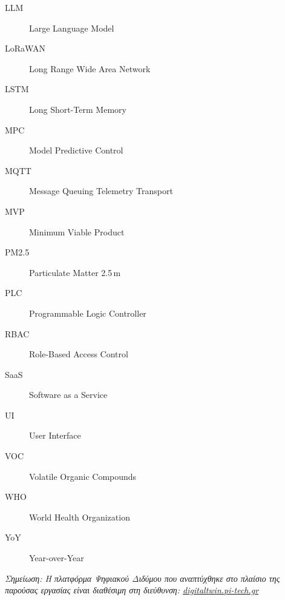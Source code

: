 \begin{description}
  \item[\textlatin{LLM}] \textlatin{Large Language Model}
  \item[\textlatin{LoRaWAN}] \textlatin{Long Range Wide Area Network}
  \item[\textlatin{LSTM}] \textlatin{Long Short-Term Memory}
  \item[\textlatin{MPC}] \textlatin{Model Predictive Control}
  \item[\textlatin{MQTT}] \textlatin{Message Queuing Telemetry Transport}
  \item[\textlatin{MVP}] \textlatin{Minimum Viable Product}
  \item[\textlatin{PM2.5}] \textlatin{Particulate Matter 2.5\,\textmu m}
  \item[\textlatin{PLC}] \textlatin{Programmable Logic Controller}
  \item[\textlatin{RBAC}] \textlatin{Role-Based Access Control}
  \item[\textlatin{SaaS}] \textlatin{Software as a Service}
  \item[\textlatin{UI}] \textlatin{User Interface}
  \item[\textlatin{VOC}] \textlatin{Volatile Organic Compounds}
  \item[\textlatin{WHO}] \textlatin{World Health Organization}
  \item[\textlatin{YoY}] \textlatin{Year-over-Year}
\end{description}

\noindent\textit{Σημείωση: Η πλατφόρμα Ψηφιακού Διδύμου που αναπτύχθηκε στο πλαίσιο της παρούσας εργασίας είναι διαθέσιμη στη διεύθυνση: \href{https://digitaltwin.pi-tech.gr}{\textlatin{digitaltwin.pi-tech.gr}}}
